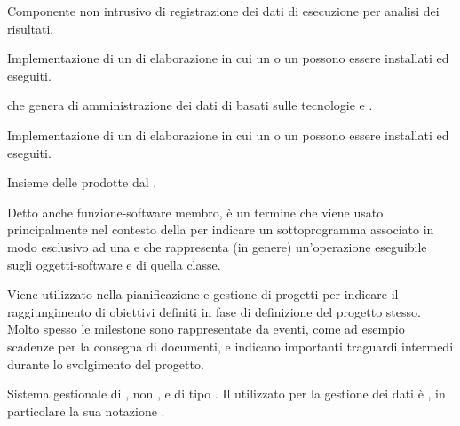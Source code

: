 {Componente non intrusivo di registrazione dei dati di esecuzione per analisi dei risultati.}



{Implementazione  di un  di elaborazione in cui un  o un  possono essere installati ed eseguiti.}



{ che genera   di amministrazione dei dati di  basati sulle tecnologie e .}

{Implementazione  di un  di elaborazione in cui un  o un  possono essere installati ed eseguiti.}


{Insieme delle  prodotte dal  .}


{Detto anche funzione-software membro, è un termine che viene usato principalmente nel contesto della   per indicare un sottoprogramma associato in modo esclusivo ad una  e che rappresenta (in genere) un'operazione eseguibile sugli oggetti-software e  di quella classe.}


{Viene utilizzato nella pianificazione e gestione di progetti per indicare il raggiungimento di obiettivi definiti in fase di definizione del progetto stesso. Molto spesso le milestone sono rappresentate da eventi, come ad esempio scadenze per la consegna di documenti, e indicano importanti traguardi intermedi durante lo svolgimento del progetto.}


{Sistema gestionale di , non ,  e di tipo . Il  utilizzato per la gestione dei dati è , in particolare la sua notazione .}

